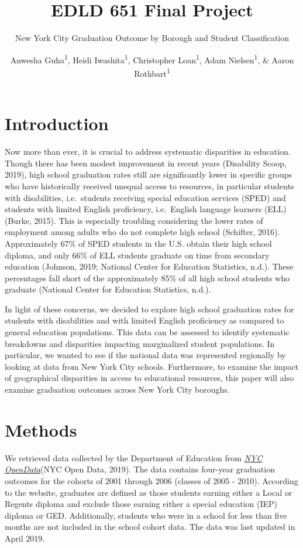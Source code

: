 \documentclass[
  english,
  man, fleqn, noextraspace]{apa6}
\title{EDLD 651 Final Project}
\subtitle{New York City Graduation Outcome by Borough and Student Classification}
\author{Anwesha Guha\textsuperscript{1}, Heidi Iwashita\textsuperscript{1}, Christopher Loan\textsuperscript{1}, Adam Nielsen\textsuperscript{1}, \& Aaron Rothbart\textsuperscript{1}}
\date{}
\affiliation{\vspace{0.5cm}\textsuperscript{1} University of Oregon}
\begin{document}
\maketitle

\hypertarget{introduction}{%
\section{Introduction}\label{introduction}}

Now more than ever, it is crucial to address systematic disparities in education. Though there has been modest improvement in recent years (Disability Scoop, 2019), high school graduation rates still are significantly lower in specific groups who have historically received unequal access to resources, in particular students with disabilities, i.e.~students receiving special education services (SPED) and students with limited English proficiency, i.e.~English language learners (ELL) (Burke, 2015). This is especially troubling considering the lower rates of employment among adults who do not complete high school (Schifter, 2016). Approximately 67\% of SPED students in the U.S. obtain their high school diploma, and only 66\% of ELL students graduate on time from secondary education (Johnson, 2019; National Center for Education Statistics, n.d.). These percentages fall short of the approximately 85\% of all high school students who graduate (National Center for Education Statistics, n.d.).

In light of these concerns, we decided to explore high school graduation rates for students with disabilities and with limited English proficiency as compared to general education populations. This data can be assessed to identify systematic breakdowns and disparities impacting marginalized student populations. In particular, we wanted to see if the national data was represented regionally by looking at data from New York City schools. Furthermore, to examine the impact of geographical disparities in access to educational resources, this paper will also examine graduation outcomes across New York City boroughs.

\hypertarget{methods}{%
\section{Methods}\label{methods}}

We retrieved data collected by the Department of Education from \href{https://data.cityofnewyork.us/Education/2005-2010-Graduation-Outcomes-By-Borough/avir-tzek}{\emph{NYC OpenData}}(NYC Open Data, 2019). The data contains four-year graduation outcomes for the cohorts of 2001 through 2006 (classes of 2005 - 2010). According to the website, graduates are defined as those students earning either a Local or Regents diploma and exclude those earning either a special education (IEP) diploma or GED. Additionally, students who were in a school for less than five months are not included in the school cohort data. The data was last updated in April 2019.
\end{document}
